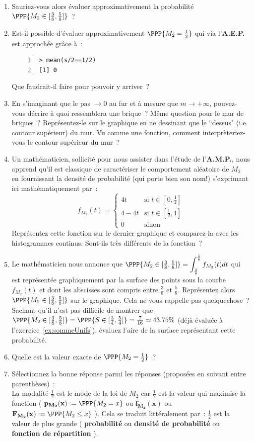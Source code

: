 \documentclass[10pt]{report}
\begin{document}
\begin{exercice}
\begin{enumerate}
\item Sauriez-vous alors évaluer approximativement la probabilité $\PPP{M_2\in [\frac38,\frac58]}$~?
\item Est-il possible d'évaluer approximativement $\PPP{M_2=\frac12}$ qui via l'\textbf{A.E.P.} est approchée grâce à~:
\begin{Verbatim}[frame=leftline,fontfamily=tt,fontshape=n,numbers=left]
> mean(s/2==1/2)
[1] 0
\end{Verbatim}

Que faudrait-il faire pour pouvoir y arriver~?
\item En s'imaginant que le pas $\to0$ au fur et à mesure que $m\to+\infty$, pouvez-vous décrire à quoi ressemblera une brique~? Même question pour le mur de briques~? Représentez-le sur le graphique en ne dessinant que le ``dessus" (i.e. contour supérieur) du mur. Vu comme une fonction, comment interprèteriez-vous le contour supérieur du mur~?  

\item Un mathématicien, sollicité pour nous assister dans l'étude de l'\textbf{A.M.P.}, nous apprend qu'il est classique de caractériser le comportement aléatoire de $M_2$ en fournissant la densité de probabilité (qui porte bien son nom!) s'exprimant ici mathématiquement par~:
\[
f_{M_2}(t)=\left\{\begin{array}{ll}
4t & \mbox{si }t\in [0,\frac12]\\
4-4t & \mbox{si }t\in [\frac12,1]\\
0 & \mbox{sinon}
\end{array}\right.
\]
Représentez cette fonction sur le dernier graphique et comparez-la avec les histogrammes continus. Sont-ils très différents de la fonction~?
\item Le mathématicien nous annonce que  $\PPP{M_2\in [\frac38,\frac58]}=\displaystyle\int_{\frac38}^{\frac58} f_{M_2}(t)dt$ qui est représentée graphiquement par la surface des points sous la courbe $f_{M_2}(t)$ et dont les abscisses sont compris entre $\frac38$ et $\frac58$. Représentez alors $\PPP{M_2\in [\frac38,\frac58]}$ sur le graphique. Cela ne vous rappelle pas quelquechose~?
Sachant qu'il n'est pas difficile de montrer que $\PPP{M_2\in [\frac38,\frac58]}=\PPP{S\in [\frac34,\frac54]}=\frac7{16}\simeq 43.75\%$ (déjà évaluée à l'exercice~\ref{ex:sommeUnifs}), évaluez l'aire de la surface représentant cette probabilité. 
\item Quelle est la valeur exacte de $\PPP{M_2=\frac12}$~?
\item Sélectionnez la bonne réponse parmi les réponses (proposées en suivant entre parenthèses)~:\\
La modalité $\frac12$ est le mode de la loi de $M_2$ car $\frac12$ est la valeur qui maximise la fonction \underline{\hspace*{1cm}} ( $\mathbf{p_{M_2}(x)}:=\PPP{M_2=x}$ ou $\mathbf{f_{M_2}(x)}$ ou $\mathbf{F_{M_2}(x)}:=\PPP{M_2\leq x}$ ).
Cela se traduit littéralement par~: $\frac12$ est la valeur de plus grande \underline{\hspace*{2cm}}( \textbf{probabilité} ou \textbf{densité de probabilité} ou \textbf{fonction de répartition} ).


\end{enumerate}
\end{exercice}
\end{document}
